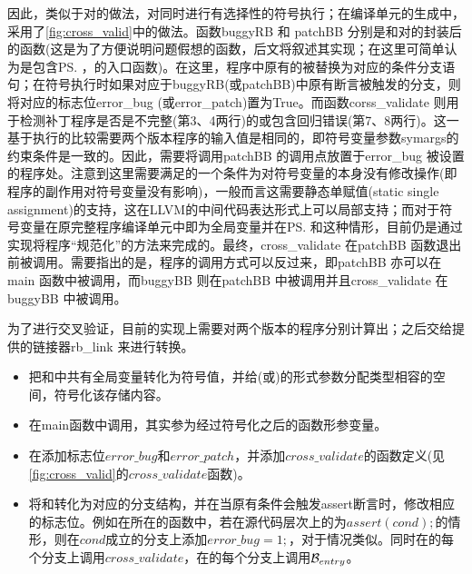 因此，类似于对\patch 的做法，\dryrun 对\bug 同时进行有选择性的符号执行；在编译单元的生成中，采用了\autoref{fig:cross_valid}中的做法。函数\textmd{buggyRB} 和 \textmd{patchBB} 分别是\bug 和\patch 对\rbscope 的封装后的函数(这是为了方便说明问题假想的函数，后文将叙述其实现；在这里可简单认为是包含\prog\ps ，\prog\bs 的入口函数\prog\entry )。在这里，程序\prog 中原有的\prog\ass 被替换为对应的条件分支语句；在符号执行时如果对应于buggyRB(或patchBB)中原有断言被触发的分支，则将对应的标志位\textmd{error\_bug} (或\textmd{error\_patch})置为True。而函数\textmd{corss\_validate} 则用于检测补丁程序是否是不完整(第3、4两行)的或包含回归错误(第7、8两行)。这一基于执行的比较需要两个版本程序的输入值是相同的，即符号变量参数\textmd{symargs}的约束条件是一致的。因此，需要将调用\textmd{patchBB} 的调用点放置于\textmd{error\_bug} 被设置的程序处。注意到这里需要满足的一个条件为对符号变量的本身没有修改操作(即程序的副作用对符号变量没有影响)，一般而言这需要静态单赋值(static single assignment)的支持，这在LLVM的中间代码表达形式上可以局部支持；而对于符号变量在原完整程序\prog 编译单元中即为全局变量并在\prog\ps 和\prog\bs 这种情形，目前仍是通过实现将程序“规范化”的方法来完成的。最终，\textmd{cross\_validate} 在\textmd{patchBB} 函数退出前被调用。需要指出的是，程序的调用方式可以反过来，即\textmd{patchBB} 亦可以在\textmd{main} 函数中被调用，而\textmd{buggyBB} 则在\textmd{patchBB} 中被调用并且\textmd{cross\_validate} 在\textmd{buggyBB} 中被调用。

为了进行交叉验证，目前的实现上\dryrun 需要对两个版本的程序分别计算出\rbscope ；之后交给\dryrun 提供的链接器rb\_link 来进行转换。
\begin{itemize}
  \item 把\bug\scope 和\patch\scope 中共有全局变量转化为符号值，并给\bug\entry (或\patch\entry )的形式参数分配类型相容的空间，符号化该存储内容。
  \item 在main函数中调用\bug\entry ，其实参为经过符号化之后的函数形参变量。
  \item 在添加标志位$error\_bug$和$error\_patch$，并添加$cross\_validate$的函数定义(见\autoref{fig:cross_valid}的$cross\_validate$函数)。
  \item 将\bug\ass 和\patch\ass 转化为对应的分支结构，并在当原有条件会触发assert断言时，修改相应的标志位。例如在\bug\ass 所在的函数中，若在源代码层次上的\bug\ass 为$assert(cond);$的情形，则在$cond$成立的分支上添加$error\_bug=1;$，对于\patch\ass 情况类似。同时在\patch\ass 的每个分支上调用$cross\_validate$，在\bug\ass 的每个分支上调用$\mathcal{B}_{entry}$。
\end{itemize}
  
